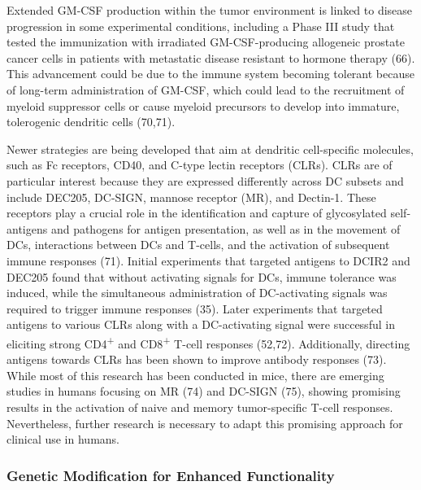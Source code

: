 \documentclass[
]{article}
\begin{document}
Extended GM-CSF production within the tumor environment is linked to
disease progression in some experimental conditions, including a Phase
III study that tested the immunization with irradiated GM-CSF-producing
allogeneic prostate cancer cells in patients with metastatic disease
resistant to hormone therapy (66). This advancement could be due to the
immune system becoming tolerant because of long-term administration of
GM-CSF, which could lead to the recruitment of myeloid suppressor cells
or cause myeloid precursors to develop into immature, tolerogenic
dendritic cells (70,71).

Newer strategies are being developed that aim at dendritic cell-specific
molecules, such as Fc receptors, CD40, and C-type lectin receptors
(CLRs). CLRs are of particular interest because they are expressed
differently across DC subsets and include DEC205, DC-SIGN, mannose
receptor (MR), and Dectin-1. These receptors play a crucial role in the
identification and capture of glycosylated self-antigens and pathogens
for antigen presentation, as well as in the movement of DCs,
interactions between DCs and T-cells, and the activation of subsequent
immune responses (71). Initial experiments that targeted antigens to
DCIR2 and DEC205 found that without activating signals for DCs, immune
tolerance was induced, while the simultaneous administration of
DC-activating signals was required to trigger immune responses (35).
Later experiments that targeted antigens to various CLRs along with a
DC-activating signal were successful in eliciting strong
CD4\textsuperscript{+} and CD8\textsuperscript{+} T-cell responses
(52,72). Additionally, directing antigens towards CLRs has been shown to
improve antibody responses (73). While most of this research has been
conducted in mice, there are emerging studies in humans focusing on MR
(74) and DC-SIGN (75), showing promising results in the activation of
naive and memory tumor-specific T-cell responses. Nevertheless, further
research is necessary to adapt this promising approach for clinical use
in humans.

\subsubsection{Genetic Modification for Enhanced
Functionality}\label{genetic-modification-for-enhanced-functionality}
\end{document}

